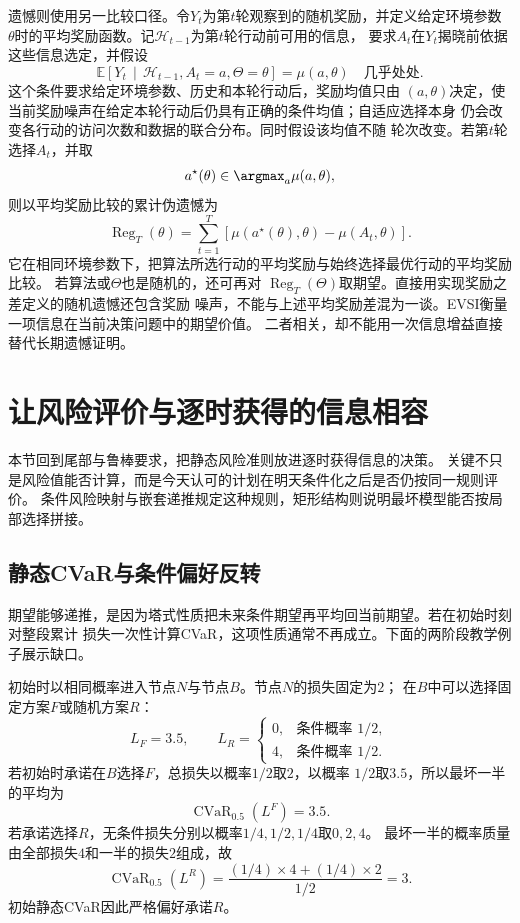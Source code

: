 遗憾则使用另一比较口径。令\(Y_t\)为第\(t\)轮观察到的随机奖励，并定义给定环境参数
\(\theta\)时的平均奖励函数。记\(\mathcal{H}_{t-1}\)为第\(t\)轮行动前可用的信息，
要求\(A_t\)在\(Y_t\)揭晓前依据这些信息选定，并假设
\[
  \mathbb{E}\left[
    Y_t
    \,\middle|\,
    \mathcal{H}_{t-1},A_t=a,\Theta=\theta
  \right]
  =
  \mu(a,\theta)
  \quad\text{几乎处处}.
\]
这个条件要求给定环境参数、历史和本轮行动后，奖励均值只由
\((a,\theta)\)决定，使当前奖励噪声在给定本轮行动后仍具有正确的条件均值；自适应选择本身
仍会改变各行动的访问次数和数据的联合分布。同时假设该均值不随
轮次改变。若第\(t\)轮选择\(A_t\)，并取
\[
  a^\star(\theta)
  \in
  \argmax_a\mu(a,\theta),
\]
则以平均奖励比较的累计伪遗憾为
\[
  \operatorname{Reg}_T(\theta)
  =
  \sum_{t=1}^{T}
  \left[
    \mu(a^\star(\theta),\theta)-\mu(A_t,\theta)
  \right].
\]
它在相同环境参数下，把算法所选行动的平均奖励与始终选择最优行动的平均奖励比较。
若算法或\(\Theta\)也是随机的，还可再对
\(\operatorname{Reg}_T(\Theta)\)取期望。直接用实现奖励之差定义的随机遗憾还包含奖励
噪声，不能与上述平均奖励差混为一谈。EVSI衡量一项信息在当前决策问题中的期望价值。
二者相关，却不能用一次信息增益直接替代长期遗憾证明。

\section{让风险评价与逐时获得的信息相容}
\label{sec:decision-dynamic-risk-time-consistency}

本节回到尾部与鲁棒要求，把静态风险准则放进逐时获得信息的决策。
关键不只是风险值能否计算，而是今天认可的计划在明天条件化之后是否仍按同一规则评价。
条件风险映射与嵌套递推规定这种规则，矩形结构则说明最坏模型能否按局部选择拼接。

\subsection{静态CVaR与条件偏好反转}
期望能够递推，是因为塔式性质把未来条件期望再平均回当前期望。若在初始时刻对整段累计
损失一次性计算CVaR，这项性质通常不再成立。下面的两阶段教学例子展示缺口。

初始时以相同概率进入节点\(N\)与节点\(B\)。节点\(N\)的损失固定为\(2\)；
在\(B\)中可以选择固定方案\(F\)或随机方案\(R\)：
\[
  L_F=3.5,
  \qquad
  L_R=
  \begin{cases}
    0,&\text{条件概率 }1/2,\\
    4,&\text{条件概率 }1/2.
  \end{cases}
\]
若初始时承诺在\(B\)选择\(F\)，总损失以概率\(1/2\)取\(2\)，以概率
\(1/2\)取\(3.5\)，所以最坏一半的平均为
\[
  \operatorname{CVaR}_{0.5}(L^{F})=3.5.
\]
若承诺选择\(R\)，无条件损失分别以概率\(1/4,1/2,1/4\)取\(0,2,4\)。
最坏一半的概率质量由全部损失\(4\)和一半的损失\(2\)组成，故
\[
  \operatorname{CVaR}_{0.5}(L^{R})
  =
  \frac{(1/4)\times4+(1/4)\times2}{1/2}
  =3.
\]
初始静态CVaR因此严格偏好承诺\(R\)。

